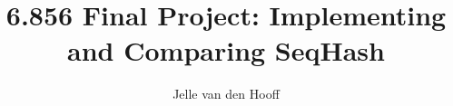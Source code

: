 \documentclass[10pt,letterpaper]{article}
\begin{document}
\title{6.856 Final Project: Implementing and Comparing SeqHash}
\author{Jelle van den Hooff}
\maketitle


\end{document}
